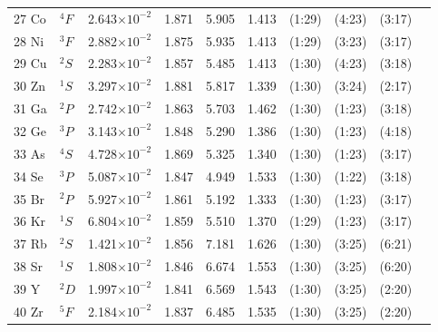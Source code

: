 \begin{longtable}{l l r r r r r r r r}
27 Co 	&  	$^{4}F$   	&   	2.643$\times10^{-2}$   	&    	1.871    	&    	5.905    	&    	1.413    	&    	(1:29)    	&    	(4:23)    	&    	(3:17)   \\
28 Ni 	&  	$^{3}F$   	&   	2.882$\times10^{-2}$   	&    	1.875    	&    	5.935    	&    	1.413    	&    	(1:29)    	&    	(3:23)    	&    	(3:17)   \\
29 Cu 	&  	$^{2}S$   	&   	2.283$\times10^{-2}$   	&    	1.857    	&    	5.485    	&    	1.413    	&    	(1:30)    	&    	(4:23)    	&    	(3:18)   \\
30 Zn 	&  	$^{1}S$   	&   	3.297$\times10^{-2}$   	&    	1.881    	&    	5.817    	&    	1.339    	&    	(1:30)    	&    	(3:24)    	&    	(2:17)   \\
31 Ga 	&  	$^{2}P$   	&   	2.742$\times10^{-2}$   	&    	1.863    	&    	5.703    	&    	1.462    	&    	(1:30)    	&    	(1:23)    	&    	(3:18)   \\
32 Ge 	&  	$^{3}P$   	&   	3.143$\times10^{-2}$   	&    	1.848    	&    	5.290    	&    	1.386    	&    	(1:30)    	&    	(1:23)    	&    	(4:18)   \\
33 As 	&  	$^{4}S$   	&   	4.728$\times10^{-2}$   	&    	1.869    	&    	5.325    	&    	1.340    	&    	(1:30)    	&    	(1:23)    	&    	(3:17)   \\
34 Se 	&	$^{3}P$   	&   	5.087$\times10^{-2}$   	&    	1.847    	&    	4.949    	&    	1.533    	&    	(1:30)    	&    	(1:22)    	&    	(3:18)   \\
35 Br 	&  	$^{2}P$   	&   	5.927$\times10^{-2}$   	&    	1.861    	&    	5.192    	&    	1.333    	&    	(1:30)    	&    	(1:23)    	&    	(3:17)   \\
36 Kr 	&  	$^{1}S$   	&   	6.804$\times10^{-2}$   	&    	1.859    	&    	5.510    	&    	1.370    	&    	(1:29)    	&    	(1:23)    	&    	(3:17)   \\
37 Rb 	&  	$^{2}S$   	&   	1.421$\times10^{-2}$   	&    	1.856    	&    	7.181    	&    	1.626    	&    	(1:30)    	&    	(3:25)    	&    	(6:21)   \\
38 Sr 	&  	$^{1}S$   	&   	1.808$\times10^{-2}$   	&    	1.846    	&    	6.674    	&    	1.553    	&    	(1:30)    	&    	(3:25)    	&    	(6:20)   \\
39 Y 		&  	$^{2}D$   	&   	1.997$\times10^{-2}$   	&    	1.841    	&    	6.569    	&    	1.543    	&    	(1:30)    	&    	(3:25)    	&    	(2:20)   \\
40 Zr 	&  	$^{5}F$   	&   	2.184$\times10^{-2}$   	&    	1.837    	&    	6.485    	&    	1.535    	&    	(1:30)    	&    	(3:25)    	&    	(2:20)   \\

\end{longtable}
